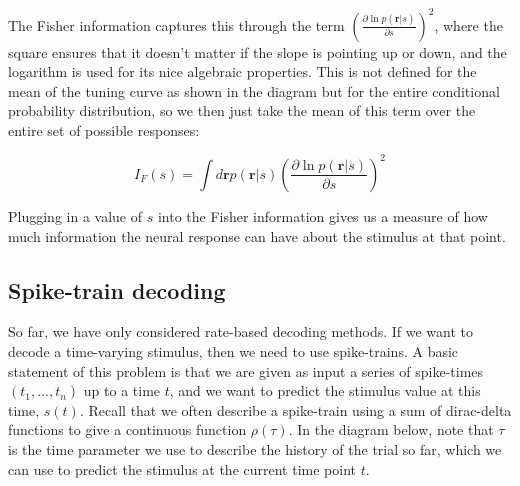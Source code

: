 \documentclass{article}
\begin{document}
The Fisher information captures this through the term $\left ( \frac{\partial\ln p(\bm{r}|s)}{\partial s} \right)^2$, where the square ensures that it doesn't matter if the slope is pointing up or down, and the logarithm is used for its nice algebraic properties. This is not defined for the mean of the tuning curve as shown in the diagram but for the entire conditional probability distribution, so we then just take the mean of this term over the entire set of possible responses:

\begin{equation*}
	I_F(s) = \int d\bm{r} p(\bm{r}|s)\left ( \frac{\partial\ln p(\bm{r}|s)}{\partial s} \right)^2
\end{equation*}

Plugging in a value of $s$ into the Fisher information gives us a measure of how much information the neural response can have about the stimulus at that point.

\subsection{Spike-train decoding}

So far, we have only considered rate-based decoding methods. If we want to decode a time-varying stimulus, then we need to use spike-trains. A basic statement of this problem is that we are given as input a series of spike-times $(t_1,...,t_n)$ up to a time $t$, and we want to predict the stimulus value at this time, $s(t)$. Recall that we often describe a spike-train using a sum of dirac-delta functions to give a continuous function $\rho (\tau)$. In the diagram below, note that $\tau$ is the time parameter we use to describe the history of the trial so far, which we can use to predict the stimulus at the current time point $t$.\\
\end{document}
